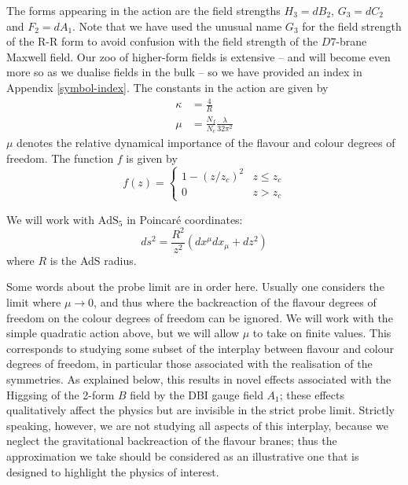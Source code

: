 \documentclass[aps,preprint,nofootinbib,preprintnumbers,eqsecnum,superscriptaddress]{revtex4}
\begin{document}
The forms appearing in the action are the field strengths $H_3 = dB_2$, $G_3 = dC_2$ and $F_2 = dA_1$. Note that we have used the unusual name $G_3$ for the field strength of the R-R form to avoid confusion with the field strength of the $D7$-brane Maxwell field. Our zoo of higher-form fields is extensive -- and will become even more so as we dualise fields in the bulk -- so we have provided an index in Appendix \ref{symbol-index}. The constants in the action are given by
\begin{subequations}
	\begin{align}
		\kappa	& = \frac{4}{R}						\label{kappa-def}	\\
		\mu		& = \frac{N_f}{N_c}\frac{\lambda}{32 \pi^2}	\label{mu-def}
	\end{align}
\end{subequations}
$\mu$ denotes the relative dynamical importance of the flavour and colour degrees of freedom. The function $f$ is given by
\begin{equation}
	\label{f-def}
	f(z) = 
	\begin{cases} 
	1 - \left(z/z_c\right)^2	& z\leq z_c \\
	0				& z > z_c
	\end{cases}
\end{equation}

We will work with $\text{AdS}_5$ in Poincar\'e coordinates:
\begin{equation}
ds^2 = \frac{R^2}{z^2} \left(dx^{\mu} dx_{\mu} + dz^2\right)	\label{Poincare-coords}
\end{equation}
where $R$ is the AdS radius.

Some words about the probe limit are in order here. Usually one considers the limit where $\mu \to 0$, and thus where the backreaction of the flavour degrees of freedom on the colour degrees of freedom can be ignored. We will work with the simple quadratic action above, but we will allow $\mu$ to take on finite values. This corresponds to studying some subset of the interplay between flavour and colour degrees of freedom, in particular those associated with the realisation of the symmetries. As explained below, this results in novel effects associated with the Higgsing of the 2-form $B$ field by the DBI gauge field $A_1$; these effects qualitatively affect the physics but are invisible in the strict probe limit.  Strictly speaking, however, we are not studying all aspects of this interplay, because we neglect the gravitational backreaction of the flavour branes; thus the approximation we take should be considered as an illustrative one that is designed to highlight the physics of interest. 
\end{document}
